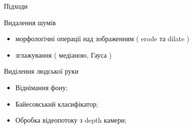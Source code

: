 \begin{frame}{Підходи}\manimate
	\begin{block}{Видалення шумів}
		\begin{itemize}
			\item морфологічні операції над зображенням ( erode та dilate )
			\item зглажування ( медіаною, Гауса )
		\end{itemize}
	\end{block}
	\begin{block}{Виділення людської руки}
		\begin{itemize}
			\item Віднімання фону;
			\item Байесовський класифікатор;
			\item Обробка відеопотоку з depth камери;
		\end{itemize}
	\end{block}	
\end{frame}

